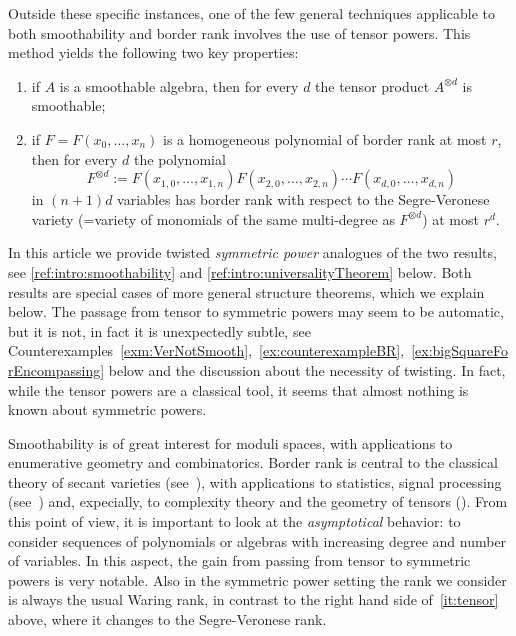 \documentclass[a4paper,11pt,reqno]{amsart}
\numberwithin{equation}{section}
\theoremstyle{definition}
\theoremstyle{plain}
\theoremstyle{remark}
\begin{document}
{Outside these specific instances, one of the few general techniques applicable to both smoothability and border rank involves the use of tensor powers. This method yields the following two key properties:}
    \begin{enumerate}[label=(\arabic*), left= 3pt, widest=2,nosep]
        \item if $A$ is a smoothable algebra, then for every $d$ the tensor
            product $A^{\otimes d}$ is smoothable;
        \item\label{it:tensor} if $F = F(x_0, \ldots ,x_n)$ is a homogeneous polynomial of border rank at most
            $r$, then for every $d$ the polynomial
            \[
                F^{\otimes d} := F(x_{1,0}, \ldots ,x_{1,n})
                F(x_{2,0}, \ldots ,x_{2,n})\cdots F( x_{d,0},
                \ldots ,x_{d,n})
            \]
            in $(n+1)d$ variables has border rank with respect to the
            Segre-Veronese variety (=variety of monomials of the same
                multi-degree as $F^{\otimes d}$) at most
            $r^{d}$.
    \end{enumerate}

    In this article we provide twisted \emph{symmetric power} analogues of the two results, see
    \autoref{ref:intro:smoothability} and
    \autoref{ref:intro:universalityTheorem} below. Both results are special
    cases of more general structure {theorems, which we} explain below.
    The passage from tensor to symmetric powers may seem to be automatic, but
    it is not, in fact it is unexpectedly subtle,
    {see Counterexamples~\ref{exm:VerNotSmooth},~\ref{ex:counterexampleBR},~\ref{ex:bigSquareForEncompassing}}
    below and the discussion about the necessity of twisting. In fact, while
    the tensor powers are a classical tool, it seems that almost nothing is
    known about symmetric powers.

    Smoothability is of {great} interest for moduli spaces, with applications
    to enumerative geometry and combinatorics. Border rank is central {to the} classical theory of secant varieties (see~\cites{BCC+18, BGI11,CGO14}), with
    applications to statistics, signal processing (see~\cites{Che11, DC07,
    McC87}) and, {expecially}, to complexity theory and the
    geometry of tensors (\cites{BCS97, landsberg2017geometry, CW}). From this point of view,
    it is important to look at the \emph{asymptotical} behavior: to consider
    sequences of polynomials or algebras with {increasing} degree and number of
    variables. In this aspect, the gain from passing from tensor to symmetric
    powers is very notable. Also in the symmetric power setting the
        rank we consider is always the usual Waring rank, in contrast {to} the
        right hand side of~\ref{it:tensor}
above, where it changes to the Segre-Veronese rank.
\end{document}
